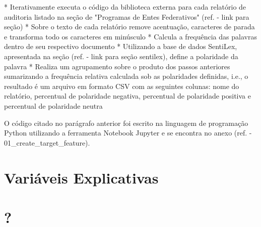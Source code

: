 * Iterativamente executa o código da biblioteca externa para cada relatório de auditoria listado na seção de "Programas de Entes Federativos" (ref. - link para seção)
* Sobre o texto de cada relatório remove acentuação, caracteres de parada e transforma todo os caracteres em minúsculo
* Calcula a frequência das palavras dentro de seu respectivo documento
* Utilizando a base de dados SentiLex, apresentada na seção (ref. - link para seção sentilex), define a polaridade da palavra
* Realiza um agrupamento sobre o produto dos passos anteriores sumarizando a frequência relativa calculada sob as polaridades definidas, i.e., o resultado é um arquivo em formato CSV com as seguintes colunas: nome do relatório, percentual de polaridade negativa, percentual de polaridade positiva e percentual de polaridade neutra

O código citado no parágrafo anterior foi escrito na linguagem de programação Python utilizando a ferramenta Notebook Jupyter e se encontra no anexo (ref. - 01_create_target_feature).

\section{Variáveis Explicativas}
\label{sec:variaveis_explicativas}



\section{?}
\label{sec:?}








